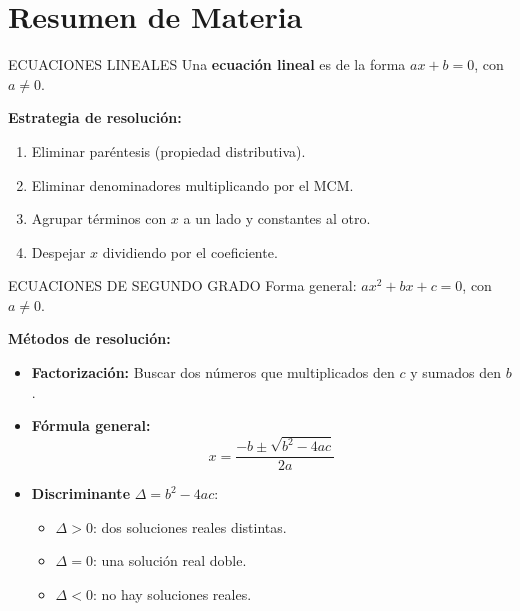 \documentclass[letterpaper, 12pt]{article}
\begin{document}
\newpage

\section*{Resumen de Materia}

\begin{materiabox}{ECUACIONES LINEALES}
Una \textbf{ecuación lineal} es de la forma $ax + b = 0$, con $a \neq 0$.

\textbf{Estrategia de resolución:}
\begin{enumerate}[leftmargin=*, itemsep=0.15cm]
    \item Eliminar paréntesis (propiedad distributiva).
    \item Eliminar denominadores multiplicando por el MCM.
    \item Agrupar términos con $x$ a un lado y constantes al otro.
    \item Despejar $x$ dividiendo por el coeficiente.
\end{enumerate}
\end{materiabox}

\vspace{0.4cm}

\begin{materiabox}{ECUACIONES DE SEGUNDO GRADO}
Forma general: $ax^2 + bx + c = 0$, con $a \neq 0$.

\textbf{Métodos de resolución:}
\begin{itemize}[leftmargin=*, itemsep=0.15cm]
    \item \textbf{Factorización:} Buscar dos números que multiplicados den $c$ y sumados den $b$.
    \item \textbf{Fórmula general:}
    \[
        x = \frac{-b \pm \sqrt{b^2 - 4ac}}{2a}
    \]
    \item \textbf{Discriminante} $\Delta = b^2 - 4ac$:
    \begin{itemize}
        \item $\Delta > 0$: dos soluciones reales distintas.
        \item $\Delta = 0$: una solución real doble.
        \item $\Delta < 0$: no hay soluciones reales.
    \end{itemize}
\end{itemize}
\end{materiabox}
\end{document}
